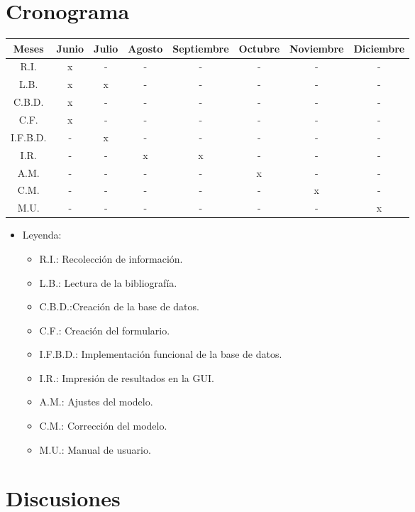 \documentclass[a4paper,openright,12pt]{report}
\begin{document}
\section{Cronograma}

\begin{center}

\begin{tabular}{|c|c|c|c|c|c|c|c|}
\hline
Meses & Junio & Julio & Agosto & Septiembre & Octubre & Noviembre & Diciembre\\ \hline
R.I. & x &  - & - & - & - & - & - \\ \hline
L.B. & x &  x & - & - & - & - & - \\ \hline
C.B.D. & x &  - & - & - & - & - & - \\ \hline
C.F. & x &  - & - & - & - & - & - \\ \hline
I.F.B.D. & - & x & - & - & - & - & - \\ \hline
I.R. & - &  - & x & x & - & - & - \\ \hline
A.M. & - &  - & - & - & x & - & - \\ \hline
C.M. & - &  - & - & - & - & x & - \\ \hline
M.U. & - &  - & - & - & - & - & x \\ \hline
\end{tabular}

\end{center}

\begin{itemize}
\item Leyenda:
	\begin{itemize}
	\item R.I.: Recolecci\'on de informaci\'on.
	\item L.B.: Lectura de la bibliograf\'ia.
	\item C.B.D.:Creaci\'on de la base de datos.
	\item C.F.: Creaci\'on del formulario.
	\item I.F.B.D.: Implementaci\'on funcional de la base de datos.
	\item I.R.: Impresi\'on de resultados en la GUI.
	\item A.M.: Ajustes del modelo.
	\item C.M.: Correcci\'on del modelo.
	\item M.U.: Manual de usuario.
	\end{itemize}
\end{itemize}

\section{Discusiones}
\end{document}
